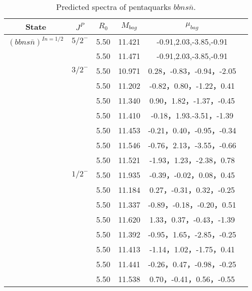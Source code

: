 \documentclass[prd,twocolumn,floatfix,nofootinbib]{revtex4}
\begin{document}
\renewcommand{\tabcolsep}{0.5cm}
\renewcommand{\arraystretch}{1.2}
 
\begin{table*}[!htbp]
    \caption{Predicted spectra of pentaquarks $bbns\bar{n}$.}
    \begin{tabular}{cccccc}
        \hline\hline
        {\rm State} &$J^{P}$ &$R_{0}$ &$M_{bag}$ &$\mu_{bag}$  \\ \hline
          ${(bbns\bar{n})}^{I{n}=1/2}$
            &${5/2}^{-}$     &5.50   &11.421 &-0.91,2.03,-3.85,-0.91  \\
                         &$ $     &5.50   &11.471 &-0.91,2.03,-3.85,-0.91  \\
            &${3/2}^{-}$     &5.50   &10.971 &0.28，-0.83，-0.94，-2.05  \\
                         &$ $     &5.50   &11.202 &-0.82，0.80，-1.22，0.41  \\
                         &$ $     &5.50   &11.340 &0.90，1.82，-1.37，-0.45  \\
                         &$ $     &5.50   &11.410 &-0.18，1.93.-3.51，-1.39 \\
                         &$ $     &5.50   &11.453 &-0.21，0.40，-0.95，-0.34  \\
                         &$ $     &5.50   &11.546 &-0.76，2.13，-3.55，-0.66  \\
                         &$ $     &5.50   &11.521 &-1.93，1.23，-2.38，0.78  \\
            &${1/2}^{-}$     &5.50   &11.935 &-0.39，-0.02，0.08，0.45  \\
                         &$ $     &5.50   &11.184 &0.27，-0.31，0.32，-0.25  \\
                         &$ $     &5.50   &11.337 &-0.89，-0.18，-0.20，0.51  \\
                         &$ $     &5.50   &11.620 &1.33，0.37，-0.43，-1.39  \\
                         &$ $     &5.50   &11.392 &-0.95，1.65，-2.85，-0.25  \\
                         &$ $     &5.50   &11.413 &-1.14，1.02，-1.75，0.41  \\
                         &$ $     &5.50   &11.441 &-0.26，0.47，-0.98，-0.25  \\
                         &$ $     &5.50   &11.538 &0.70，-0.41，0.56，-0.55  \\
               \hline\hline
    \end{tabular}
\end{table*}
\end{document}
